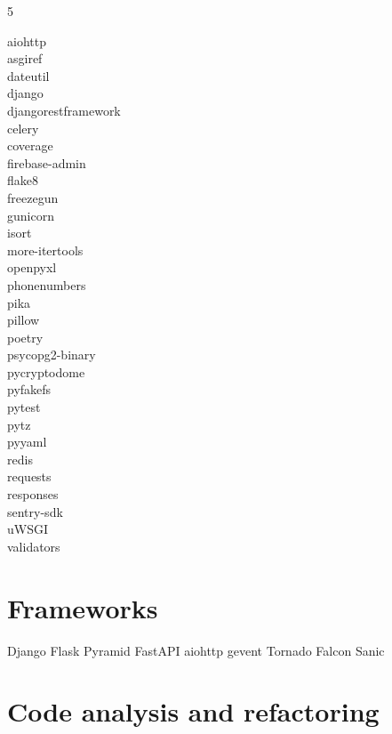 \documentclass [8pt] {extarticle}
\begin{document}
    \begin {multicols} {5}

    aiohttp \\
    asgiref \\
    dateutil \\
    django \\
    djangorestframework \\
    celery \\
    coverage \\
    firebase-admin \\
    flake8 \\
    freezegun \\
    gunicorn \\
    isort \\
    more-itertools \\
    openpyxl \\
    phonenumbers \\
    pika \\
    pillow \\
    poetry \\
    psycopg2-binary \\
    pycryptodome \\
    pyfakefs \\
    pytest \\
    pytz \\
    pyyaml \\
    redis \\
    requests \\
    responses \\
    sentry-sdk \\
    uWSGI \\
    validators \\

    \end {multicols}

    \section {Frameworks}

    Django \quad
    Flask \quad
    Pyramid \quad
    FastAPI \quad
    aiohttp \quad
    gevent \quad
    Tornado \quad
    Falcon \quad
    Sanic

    \section {Code analysis and refactoring}
\end{document}
